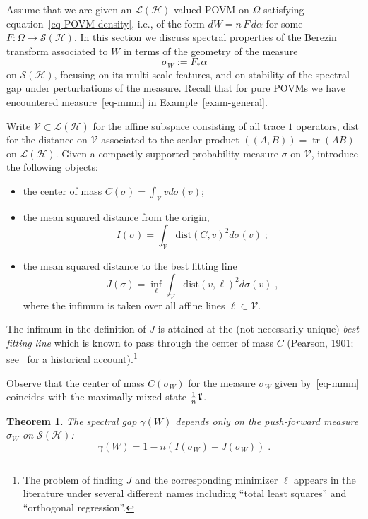 \documentclass[11pt]{article}
\newtheorem{theo}{Theorem}[section]
\theoremstyle{definition}
\numberwithin{equation}{section}
\numberwithin{figure}{section}
\numberwithin{table}{section}
\DeclareMathOperator{\tr}{tr}
\newcommand{\cS}{{\mathcal{S}}}
\newcommand{\cV}{{\mathcal{V}}}
\newcommand*\id{{1\hskip-2.5pt{\rm l}}}
\newcommand{\Hilb}{\mathcal{H}}
\newcommand\< {\mathcal{h}}
\renewcommand\> {\mathcal{i}}
\newcommand*\cL{\mathscr{L}}
\begin{document}
Assume that we are given an $\cL(\Hilb)$-valued POVM on $\Omega$ satisfying equation~\eqref{eq-POVM-density}, i.e., of the form $dW = n\,F\,d\alpha$ for some $F:\Omega \to \cS(\Hilb)$. In this section we discuss spectral properties of the Berezin transform associated to $W$ in terms of the geometry of the measure
\begin{equation}\label{eq-mmm}
\sigma_W:= F_*\alpha
\end{equation}
on $\cS(\Hilb)$, focusing on its multi-scale features, and on stability of the spectral gap under perturbations of the measure. Recall that for pure POVMs we have encountered measure~\eqref{eq-mmm} in Example~\ref{exam-general}.



Write $\cV \subset \cL(\Hilb)$ for the affine subspace consisting of all trace $1$ operators, $\text{dist}$ for the distance on $\cV$ associated to the scalar product $((A,B))=\tr(AB)$ on $\cL(\Hilb)$. Given a compactly supported probability measure $\sigma$ on $\cV$, introduce the following objects:
\begin{itemize}
\item the center of mass $C(\sigma)= \int_\cV v d\sigma(v)$;
\item the mean squared distance from the origin,
\[
I(\sigma)= \int_\cV \text{dist}(C,v)^2 d\sigma(v)\;;
\]
\item the mean squared distance to the best fitting line
\[
J(\sigma) = \inf_\ell \int_\cV \text{dist}(v,\ell)^2 d\sigma(v)\;,
\]
where the infimum is taken over all affine lines $\ell \subset \cV$.
\end{itemize}
The infimum in the definition of $J$ is attained at the (not necessarily unique) \emph{best fitting line} which is known to pass through the center of mass $C$ (Pearson, 1901; see~\cite[p.~188]{Fare} for a historical account).\footnote{The problem of finding $J$ and the corresponding minimizer $\ell$ appears in the literature under several different names including ``total least squares'' and ``orthogonal regression''.}

Observe that the center of mass $C(\sigma_W)$ for the measure $\sigma_W$ given by~\eqref{eq-mmm} coincides with the maximally mixed state $\frac{1}{n}\id$.


%

\begin{theo}\label{prop-best-fit}
The spectral gap $\gamma(W)$ depends
only on the push-forward measure $\sigma_W$ on $\cS(\Hilb)$:
\[
\gamma(W) = 1 - n(I(\sigma_W)-J(\sigma_W))\;.
\]
\end{theo}
\end{document}
